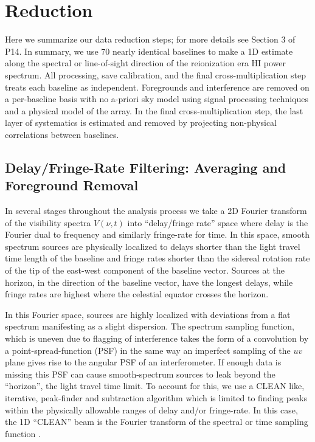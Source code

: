 \documentclass{aastex}
\begin{document}
\section{Reduction}
\label{sec:obs_meth}
Here we summarize our data reduction steps; for more details see Section 3 of P14.  In summary, we use 70 nearly identical baselines to make a 1D estimate along the spectral or line-of-sight direction of the reionization era HI power spectrum.  All processing, save calibration, and  the final cross-multiplication step treats each baseline as independent. Foregrounds and interference are removed on a per-baseline basis with no a-priori sky model using signal processing techniques and a physical model of the array. In the final cross-multiplication step, the last layer of systematics is estimated and removed by projecting non-physical correlations between baselines.
\subsection{Delay/Fringe-Rate Filtering: Averaging and Foreground Removal}
\label{sec:transforms}
In several stages throughout the analysis process we take a 2D Fourier transform of the visibility spectra $V(\nu,t)$ into ``delay/fringe rate'' space where delay is the Fourier dual to frequency and similarly fringe-rate for time.  In this space, smooth spectrum sources are physically localized to delays shorter than the light travel time length of the baseline and fringe rates shorter than the sidereal rotation rate of the tip of the east-west component of the baseline vector. Sources at the horizon, in the direction of the baseline vector, have the longest delays, while fringe rates are highest where the celestial equator crosses the horizon. 


 In this Fourier space, sources are highly localized with deviations from a flat spectrum manifesting as a slight dispersion. The spectrum sampling function, which is uneven due to flagging of interference takes the form of a convolution by a point-spread-function (PSF) in the same way an imperfect sampling of the $uv$ plane gives rise to the angular PSF of an interferometer.  If enough data is missing this PSF can cause smooth-spectrum sources to leak beyond the ``horizon'', the light travel time limit.  To account for this, we use a CLEAN like, iterative, peak-finder and subtraction algorithm which is limited to finding peaks within the physically allowable ranges of delay and/or fringe-rate. In this case, the 1D ``CLEAN'' beam is the Fourier transform of the spectral or time sampling function \citep{Parsons:2009p7859}.
\end{document}
